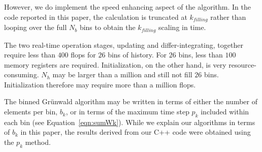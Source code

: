 However, we do implement the speed enhancing aspect of the algorithm. In the code reported in this paper, the calculation is truncated at $k_{filling}$ rather than looping over the full $N_b$ bins to obtain the $k_{filling}$ scaling in time. 

The two real-time operation stages, updating and differ-integrating,
together require less than $400$ flops for $26$ bins of
history. For $26$ bins, less than $100$ memory registers are
required. Initialization, on the other hand, is very
resource-consuming. $N_h$ may be larger than a million and still not
fill $26$ bins. Initialization therefore may require more than a
million flops.

The binned Gr{\"u}nwald algorithm may be written in terms of either the
number of elements per bin, $b_k$, or in terms of the maximum time
step $p_k$ included within each bin (see
Equation~\ref{eqn:sumWk}). While we explain our algorithms in terms of
$b_k$ in this paper, the results derived from our C++ code were
obtained using the $p_k$ method.

